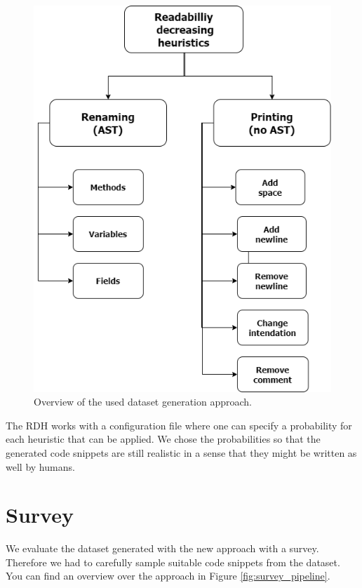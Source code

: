 \documentclass[%
class=scrreprt,
chapterprefix=false,%
open=right,%
twoside=false,%
paper=a4,%
logofile={Logo\_zentral\_farbig\_EN.png},%
thesistype=master,%
UKenglish,%
]{se2thesis}
\begin{document}
	\begin{figure}[t]
		\centering
		\includegraphics[width=\textwidth]{img/rdh.png}
		\caption{Overview of the used dataset generation approach.}
		\label{fig:rdh}
	\end{figure}
	
	The RDH works with a configuration file where one can specify a probability for each heuristic that can be applied. We chose the probabilities so that the generated code snippets are still realistic in a sense that they might be written as well by humans.
	
	\section{Survey} \label{Survey}
	We evaluate the dataset generated with the new approach with a survey. Therefore we had to carefully sample suitable code snippets from the dataset. You can find an overview over the approach in Figure \ref{fig:survey_pipeline}.
	
\end{document}
